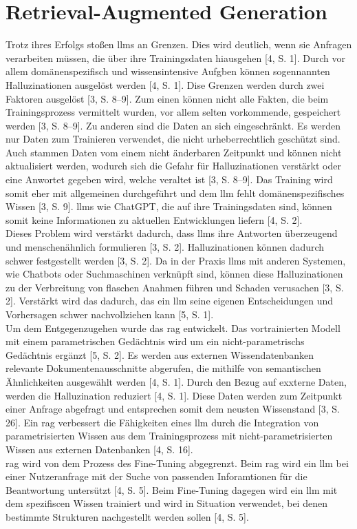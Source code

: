 \section{Retrieval-Augmented Generation}\label{sec:rag}

Trotz ihres Erfolgs stoßen \acp{llm} an Grenzen. Dies wird deutlich, wenn sie Anfragen verarbeiten müssen, die über ihre Trainingsdaten hiausgehen [4, S. 1]. Durch 
vor allem domänenspezifisch und wissensintensive Aufgben können sogennannten Halluzinationen ausgelöst werden [4, S. 1]. Dise Grenzen werden durch zwei Faktoren 
ausgelöst [3, S. 8–9]. Zum einen können nicht alle Fakten, die beim Trainingsprozess vermittelt wurden, vor allem selten vorkommende, gespeichert werden [3, S. 8–9].
Zu anderen sind die Daten an sich eingeschränkt. Es werden nur Daten zum Trainieren verwendet, die nicht urheberrechtlich geschützt sind. Auch stammen Daten vom einem 
nicht änderbaren Zeitpunkt und können nicht aktualisiert werden, wodurch sich die Gefahr für Halluzinationen verstärkt oder eine Anwortet gegeben wird, welche
veraltet ist [3, S. 8–9]. Das Training wird somit eher mit allgemeinen durchgeführt und dem \ac{llm} fehlt domänenspezifisches Wissen [3, S. 9]. \acp{llm} wie
ChatGPT, die auf ihre Trainingsdaten sind, können somit keine Informationen zu aktuellen Entwicklungen liefern [4, S. 2]. \\
Dieses Problem wird verstärkt dadurch, dass \acp{llm} ihre Antworten überzeugend und menschenähnlich formulieren [3, S. 2]. Halluzinationen können dadurch schwer festgestellt 
werden [3, S. 2]. Da in der Praxis \acp{llm} mit anderen Systemen, wie Chatbots oder Suchmaschinen verknüpft sind, können diese Halluzinationen zu der
Verbreitung von flaschen Anahmen führen und Schaden verusachen [3, S. 2]. Verstärkt wird das dadurch, das ein \ac{llm} seine eigenen Entscheidungen und Vorhersagen
schwer nachvollziehen kann [5, S. 1]. \\
Um dem Entgegenzugehen wurde das \acl{rag} entwickelt. Das vortrainierten Modell mit einem parametrischen Gedächtnis wird um ein nicht-parametrischs Gedächtnis 
ergänzt [5, S. 2]. Es werden aus externen Wissendatenbanken relevante Dokumentenausschnitte abgerufen, die mithilfe von semantischen Ähnlichkeiten ausgewählt 
werden [4, S. 1]. Durch den Bezug auf exxterne Daten, werden die Halluzination reduziert [4, S. 1]. Diese Daten werden zum Zeitpunkt einer Anfrage abgefragt und
entsprechen somit dem neusten Wissenstand [3, S. 26]. Ein \ac{rag} verbessert die Fähigkeiten eines \ac{llm} durch die Integration von parametrisierten Wissen
aus dem Trainingsprozess mit nicht-parametrisierten Wissen aus externen Datenbanken [4, S. 16]. \\
\ac{rag} wird von dem Prozess des Fine-Tuning abgegrenzt. Beim \ac{rag} wird ein \ac{llm} bei einer Nutzeranfrage mit der Suche von passenden Inforamtionen für die
Beantwortung untersützt [4, S. 5]. Beim Fine-Tuning dagegen wird ein \ac{llm} mit dem spezifiscen Wissen trainiert und wird in Situation verwendet, bei denen 
bestimmte Strukturen nachgestellt werden sollen [4, S. 5]. 

